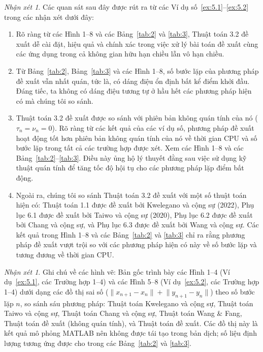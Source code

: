 \documentclass{MyBook}
\theoremstyle{plain}
\theoremstyle{definition}
\theoremstyle{remark}
\newtheorem{remark}[theorem]{Nhận xét}
\numberwithin{equation}{chapter}
\newcommand{\nm}[1]{\lVert #1\rVert}
\begin{document}
\begin{remark}\label{rem:5.3}
Các quan sát sau đây được rút ra từ các Ví dụ số~\ref{ex:5.1}--\ref{ex:5.2} trong các nhận xét dưới đây:
\begin{enumerate}[label=(\arabic*).]
\item Rõ ràng từ các Hình 1--8 và các Bảng~\ref{tab:2} và \ref{tab:3}, Thuật toán 3.2 đề xuất dễ cài đặt, hiệu quả và chính xác trong việc xử lý bài toán đề xuất cùng các ứng dụng trong cả không gian hữu hạn chiều lẫn vô hạn chiều.
\item Từ Bảng~\ref{tab:2}, Bảng~\ref{tab:3} và các Hình 1--8, số bước lặp của phương pháp đề xuất vẫn nhất quán, tức là, có dáng điệu ổn định bất kể điểm khởi đầu. Đáng tiếc, ta không có dáng điệu tương tự ở hầu hết các phương pháp hiện có mà chúng tôi so sánh.
\item Thuật toán 3.2 đề xuất được so sánh với phiên bản không quán tính của nó ($\tau_n=\nu_n=0$). Rõ ràng từ các kết quả của các ví dụ số, phương pháp đề xuất hoạt động tốt hơn phiên bản không quán tính của nó về thời gian CPU và số bước lặp trong tất cả các trường hợp được xét. Xem các Hình 1--8 và các Bảng~\ref{tab:2}--\ref{tab:3}. Điều này ủng hộ lý thuyết đằng sau việc sử dụng kỹ thuật quán tính để tăng tốc độ hội tụ cho các phương pháp lặp điểm bất động.
\item Ngoài ra, chúng tôi so sánh Thuật toán 3.2 đề xuất với một số thuật toán hiện có: Thuật toán 1.1 được đề xuất bởi Kwelegano và cộng sự (2022), Phụ lục 6.1 được đề xuất bởi Taiwo và cộng sự (2020), Phụ lục 6.2 được đề xuất bởi Chang và cộng sự, và Phụ lục 6.3 được đề xuất bởi Wang và cộng sự. Các kết quả trong Hình 1--8 và các Bảng~\ref{tab:2} và \ref{tab:3} chỉ ra rằng phương pháp đề xuất vượt trội so với các phương pháp hiện có này về số bước lặp và tương đương về thời gian CPU.
\end{enumerate}
\end{remark}

\begin{remark}
Ghi chú về các hình vẽ: Bản gốc trình bày các Hình 1--4 (Ví dụ~\ref{ex:5.1}, các Trường hợp 1--4) và các Hình 5--8 (Ví dụ~\ref{ex:5.2}, các Trường hợp 1--4) dưới dạng các đồ thị sai số ($\nm{x_{n+1}-x_n}+\nm{y_{n+1}-y_n}$) theo số bước lặp $n$, so sánh sáu phương pháp: Thuật toán Kwelegano và cộng sự, Thuật toán Taiwo và cộng sự, Thuật toán Chang và cộng sự, Thuật toán Wang \& Fang, Thuật toán đề xuất (không quán tính), và Thuật toán đề xuất. Các đồ thị này là kết quả mô phỏng MATLAB nên không được tái tạo trong bản dịch; số liệu định lượng tương ứng được cho trong các Bảng~\ref{tab:2} và \ref{tab:3}.
\end{remark}
\end{document}
